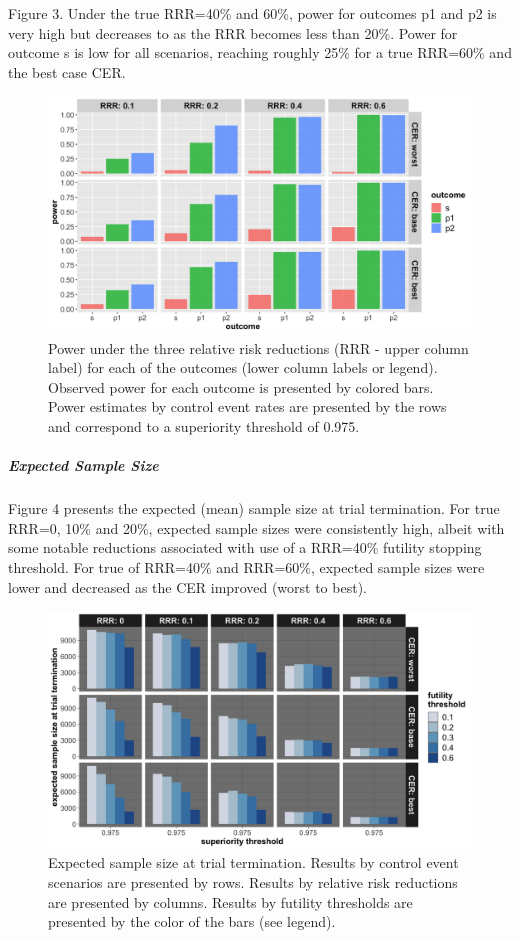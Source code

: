 \documentclass[]{article}
\let\oldsubparagraph\subparagraph
\renewcommand{\subparagraph}[1]{\oldsubparagraph{#1}\mbox{}}
\begin{document}
Figure 3. Under the true RRR=40\% and 60\%, power for outcomes p1 and p2
is very high but decreases to as the RRR becomes less than 20\%. Power
for outcome s is low for all scenarios, reaching roughly 25\% for a true
RRR=60\% and the best case CER.

\begin{figure}
  \caption{Power under the three relative risk reductions (RRR - upper column label) for each of the outcomes (lower
  column labels or legend). Observed power for each outcome is presented by colored bars. Power estimates by control
  event rates are presented by the rows and correspond to a superiority threshold of 0.975.}
  \includegraphics{../p1_plots/batch_size_nb_1000/power_p1.png}
\end{figure}

\hypertarget{expected-sample-size}{%
\subparagraph{Expected Sample Size}\label{expected-sample-size}}

Figure 4 presents the expected (mean) sample size at trial termination.
For true RRR=0, 10\% and 20\%, expected sample sizes were consistently
high, albeit with some notable reductions associated with use of a
RRR=40\% futility stopping threshold. For true of RRR=40\% and RRR=60\%,
expected sample sizes were lower and decreased as the CER improved
(worst to best).

\begin{figure}
  \caption{Expected sample size at trial termination. Results by control event scenarios are presented by rows. Results
  by relative risk reductions are presented by columns. Results by futility thresholds are presented by the color of the bars (see legend).}
  \includegraphics{../p1_plots/batch_size_nb_1000/exp_sample_size_p1.png}
\end{figure}
\end{document}
